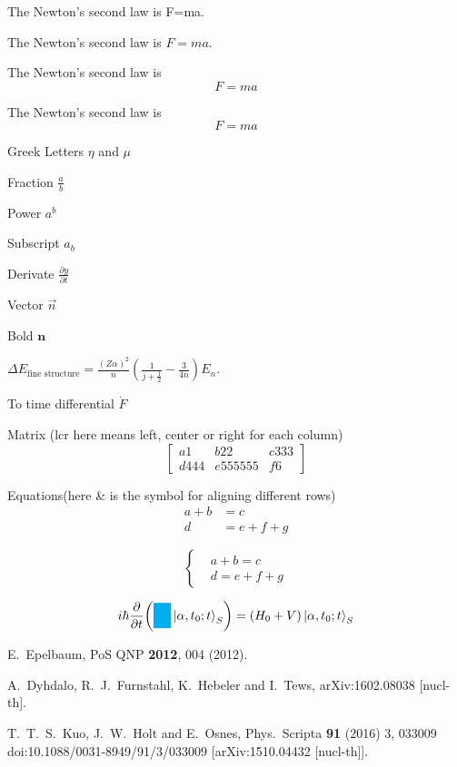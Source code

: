 \documentclass{article}
\newcommand{\cbox}[2][cyan]
{\mathchoice
	{\setlength{\fboxsep}{0pt}\colorbox{#1}{$\displaystyle#2$}}
	{\setlength{\fboxsep}{0pt}\colorbox{#1}{$\textstyle#2$}}
	{\setlength{\fboxsep}{0pt}\colorbox{#1}{$\scriptstyle#2$}}
	{\setlength{\fboxsep}{0pt}\colorbox{#1}{$\scriptscriptstyle#2$}}
}
\newcommand{\grande}{\cbox{\phantom{\frac{1}{xx}}}}
\begin{document}
The Newton's second law is F=ma.

The Newton's second law is $F=ma$.

The Newton's second law is
$$F=ma$$

The Newton's second law is
\[F=ma\]

Greek Letters $\eta$ and $\mu$

Fraction $\frac{a}{b}$

Power $a^b$

Subscript $a_b$

Derivate $\frac{\partial y}{\partial t} $

Vector $\vec{n}$

Bold $\mathbf{n}$



$\Delta E_{\text{fine structure}}=\frac{(Z\alpha)^2}{n}\left(\frac{1}{j+\frac{1}{2}}-\frac{3}{4n}\right)E_n.$


To time differential $\dot{F}$

Matrix (lcr here means left, center or right for each column)
\[
\left[
\begin{array}{lcr}
a1&b22& c333 \\
d444 & e555555 & f6
\end{array}
\right]
\]

Equations(here \& is the symbol for aligning different rows)
\begin{align}
a+b&=c\\
d&=e+f+g
\end{align}

\[
\left\{
\begin{aligned}
&a+b=c\\
&d=e+f+g
\end{aligned}
\right.\]

$$
i\hbar \pdv{t}(\grande\ket{\alpha,t_0;t}_S)=(H_0+V)\ket{\alpha,t_0;t}_S
$$
\begin{thebibliography}{1}

  E.~Epelbaum,
  PoS QNP {\bf 2012}, 004 (2012).

  A.~Dyhdalo, R.~J.~Furnstahl, K.~Hebeler and I.~Tews,
  arXiv:1602.08038 [nucl-th].
  
  T.~T.~S.~Kuo, J.~W.~Holt and E.~Osnes,
  Phys.\ Scripta {\bf 91} (2016) 3,  033009
  doi:10.1088/0031-8949/91/3/033009
  [arXiv:1510.04432 [nucl-th]].
\end{thebibliography}
\end{document}
